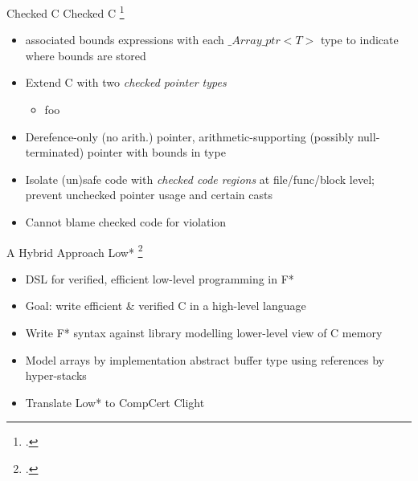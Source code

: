 \documentclass[aspectratio=169]{beamer}
\begin{document}
\begin{frame}{Checked C} %
Checked C \footcite{ruef_checked_2017}
    \begin{itemize}
        \item associated bounds expressions with each $\_Array\_ptr<T>$ type to indicate where bounds are stored
        \item Extend C with two \emph{checked pointer types} 
            \begin{itemize}
                \item foo
            \end{itemize}
        \item Derefence-only (no arith.) pointer, arithmetic-supporting (possibly null-terminated) pointer with bounds in type
        \item Isolate (un)safe code with \emph{checked code regions} at file/func/block level; prevent unchecked pointer usage and certain casts
        \item Cannot blame checked code for violation
    \end{itemize}
\end{frame}

\begin{frame}{A Hybrid Approach}
Low* \footcite{protzenko_verified_2017}
\begin{itemize}
    \item DSL for verified, efficient low-level programming in F* %
    \item Goal: write efficient \& verified C in a high-level language
    \item Write F* syntax against library modelling lower-level view of C memory
    \item Model arrays by implementation abstract buffer type using references by hyper-stacks %
    \item Translate Low* to CompCert Clight
\end{itemize}
\end{frame}
\end{document}
